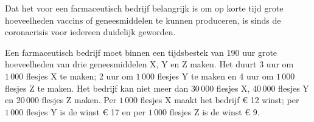 
    \begin{kader}
        Dat het voor een farmaceutisch bedrijf belangrijk is om op korte tijd grote hoeveelheden vaccins of geneesmiddelen te kunnen produceren, is sinds de coronacrisis voor iedereen duidelijk geworden.

        Een farmaceutisch bedrijf moet binnen een tijdsbestek van 190 uur grote hoeveelheden van drie geneesmiddelen X, Y en Z maken. Het duurt 3 uur om $1\,000$ flesjes X te maken; 2 uur om $1\,000$ flesjes Y te maken en 4 uur om $1\,000$ flesjes Z te maken. Het bedrijf kan niet meer dan $30\,000$ flesjes X, $40\,000$ flesjes Y en $20\,000$ flesjes Z maken. Per $1\,000$ flesjes X maakt het bedrijf € 12 winst; per $1\,000$ flesjes Y is de winst € 17 en per $1\,000$ flesjes Z is de winst € 9.
    \end{kader}


